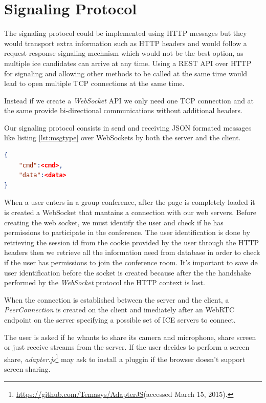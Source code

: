 \section{Signaling Protocol}

The signaling protocol could be implemented using \ac{HTTP} messages but they would transport extra information such as \ac{HTTP} headers and would follow a request response signaling mechnism which would not be the best option, as multiple ice candidates can arrive at any time. Using a \ac{REST} \ac{API} over \ac{HTTP} for signaling and allowing other methods to be called at the same time would lead to open multiple \ac{TCP} connections at the same time.

Instead if we create a \emph{WebSocket} \ac{API} we only need one \ac{TCP} connection and at the same provide bi-directional communications without additional headers.

Our signaling protocol consists in send and receiving \ac{JSON} formated messages like listing \ref{lst:msgtype} over WebSockets by both the server and the client. 

\begin{minipage}{\linewidth}
\begin{lstlisting}[caption={General structure of our WebSocket messages},label={lst:msgtype},language=json]
{
	"cmd":<cmd>,
	"data":<data>
}
\end{lstlisting}
\end{minipage}

When a user enters in a group conference, after the page is completely loaded it is created a WebSocket that mantains a connection with our web servers. 
Before creating the web socket, we must identify the user and check if he has permissions to participate in the conference. The user identification is done by retrieving the session id from the cookie provided by the user through the \ac{HTTP} headers then we retrieve all the information need from database in order to check if the user has permissions to join the conference room. It's important to save de user identification before the socket is created because after the the handshake performed by the \emph{WebSocket} protocol\cite{rfc6455} the \ac{HTTP} context is lost.

When the connection is established between the server and the client, a \emph{PeerConnection} is created on the client and imediately after an \ac{WebRTC} endpoint on the server specifying a possible set of \ac{ICE} servers to connect.

The user is asked if he whants to share its camera and microphone, share screen or just receive streams from the server. If the user decides to perform a screen share, \emph{adapter.js}\footnote{\url{https://github.com/Temasys/AdapterJS}(accessed March 15, 2015).} may ask to install a pluggin if the browser doesn't support screen sharing.

